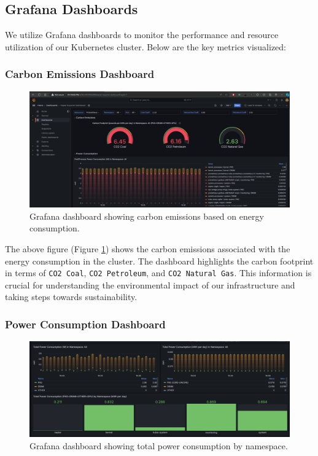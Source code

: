 \subsection{Grafana Dashboards}
We utilize Grafana dashboards to monitor the performance and resource utilization of our Kubernetes cluster. Below are the key metrics visualized:
\subsubsection{Carbon Emissions Dashboard}
\begin{figure}[H]
    \centering
    \includegraphics[width=\textwidth]{Figures/grafana-dashboard-1.png}
    \caption{Grafana dashboard showing carbon emissions based on energy consumption.}
    \label{fig:grafana-dashboard-2}
\end{figure}

The above figure (Figure \ref{fig:grafana-dashboard-2}) shows the carbon emissions associated with the energy consumption in the cluster. The dashboard highlights the carbon footprint in terms of \texttt{CO2 Coal}, \texttt{CO2 Petroleum}, and \texttt{CO2 Natural Gas}. This information is crucial for understanding the environmental impact of our infrastructure and taking steps towards sustainability.


\subsubsection{Power Consumption Dashboard}
\begin{figure}[H]
    \centering
    \includegraphics[width=\textwidth]{Figures/grafana-dashboard-2.png}
    \caption{Grafana dashboard showing total power consumption by namespace.}
    \label{fig:grafana-dashboard-1}
\end{figure}

